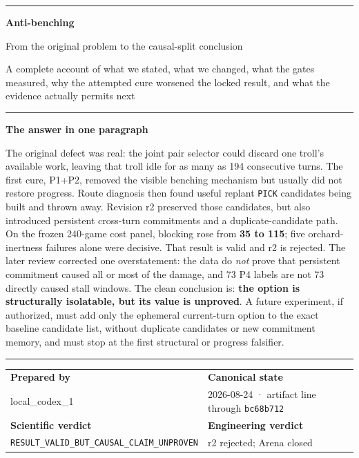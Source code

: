 \documentclass[10pt,a4paper]{article}
\newcommand{\code}[1]{\texttt{#1}}
\newenvironment{BlueBox}
  {\par\medskip\noindent\begin{minipage}{\textwidth}\color{accent}\hrule height 1.1pt\vspace{5pt}\color{ink}}
  {\vspace{2pt}\color{accent}\hrule height 1.1pt\end{minipage}\par\medskip}
\begin{document}
\thispagestyle{empty}
\vspace*{10mm}
{\color{accent}\rule{\textwidth}{2.2pt}}

\vspace{10mm}
{\fontsize{27}{32}\selectfont\bfseries\color{ink}
Anti-benching}

\vspace{2mm}
{\fontsize{17}{22}\selectfont\color{accent}
From the original problem to the causal-split conclusion}

\vspace{9mm}
{\large\color{muted}
A complete account of what we stated, what we changed, what the gates measured,
why the attempted cure worsened the locked result, and what the evidence actually permits next}

\vspace{13mm}
\begin{BlueBox}
{\large\bfseries\color{ink}The answer in one paragraph}

The original defect was real: the joint pair selector could discard one troll's available work,
leaving that troll idle for as many as 194 consecutive turns. The first cure, P1+P2, removed the
visible benching mechanism but usually did not restore progress. Route diagnosis then found useful
replant \code{PICK} candidates being built and thrown away. Revision r2 preserved those candidates,
but also introduced persistent cross-turn commitments and a duplicate-candidate path. On the
frozen 240-game cost panel, blocking rose from \textbf{35 to 115}; five orchard-inertness failures
alone were decisive. That result is valid and r2 is rejected. The later review corrected one
overstatement: the data do \emph{not} prove that persistent commitment caused all or most of the
damage, and 73 P4 labels are not 73 directly caused stall windows. The clean conclusion is:
\textbf{the option is structurally isolatable, but its value is unproved}. A future experiment, if
authorized, must add only the ephemeral current-turn option to the exact baseline candidate list,
without duplicate candidates or new commitment memory, and must stop at the first structural or
progress falsifier.
\end{BlueBox}

\vfill
\begin{tabularx}{\textwidth}{@{}Y Y@{}}
\textbf{Prepared by} & \textbf{Canonical state} \\
local\_codex\_1 & 2026-08-24 · artifact line through \code{bc68b712} \\
\addlinespace
\textbf{Scientific verdict} & \textbf{Engineering verdict} \\
\code{RESULT\_VALID\_BUT\_CAUSAL\_CLAIM\_UNPROVEN} & r2 rejected; Arena closed \\
\end{tabularx}
\end{document}
